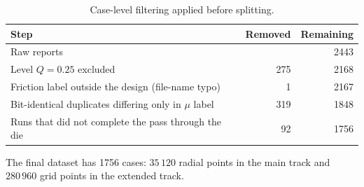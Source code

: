 \documentclass[subscriptcorrection,upint,varvw,barcolor=Goldenrod3,mathalfa=cal=euler,balance,hyphenate,french,pdf-a]{asmejour} %
\begin{document}
\begin{table}[htbp]
\centering\small
\caption{Case-level filtering applied before splitting.}
\label{tab:filtering}
\begin{tabular}{@{}lrr@{}}
\toprule
Step & Removed & Remaining \\
\midrule
Raw reports                                            &     & 2443 \\ %
Level $Q=0.25$ excluded                                & 275 & 2168 \\ %
Friction label outside the design (file-name typo)     & 1   & 2167 \\ %
Bit-identical duplicates differing only in $\mu$ label & 319 & 1848 \\ %
Runs that did not complete the pass through the die    & 92  & 1756 \\ %
\bottomrule
\end{tabular}
\end{table}

The final dataset has 1756 cases: $35\,120$ radial points in the main track and $280\,960$ grid points in the extended track. %
\end{document}

